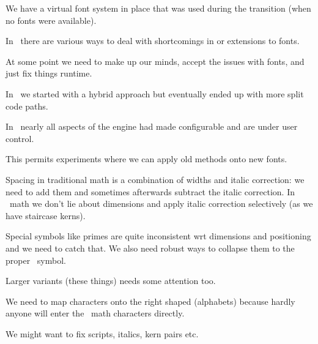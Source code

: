\startitem
    We have a virtual font system in place that was used during the transition (when no
    fonts were available).
\stopitem

\startitem
    In \CONTEXT\ there are various ways to deal with shortcomings in or extensions to fonts.
\stopitem

\startitem
    At some point we need to make up our minds, accept the issues with fonts, and
    just fix things runtime.
\stopitem

\stopitemize

\stoptitle

\starttitle[title=The engine]

\startitemize

\startitem
    In \LUATEX\ we started with a hybrid approach but eventually ended up with
    more split code paths.
\stopitem

\startitem
    In \LUAMETATEX\ nearly all aspects of the engine had made configurable and are under
    user control.
\stopitem

\startitem
    This permits experiments where we can apply old methods onto new fonts.
\stopitem

\stopitemize

\stoptitle

\starttitle[title=The tricky things]

\startitemize

\startitem
    Spacing in traditional math is a combination of widths and italic correction:
    we need to add them and sometimes afterwards subtract the italic correction.
    In \OPENTYPE\ math we don't lie about dimensions and apply italic correction
    selectively (as we have staircase kerns).
\stopitem

\startitem
    Special symbols like primes are quite inconsistent wrt dimensions and positioning
    and we need to catch that. We also need robust ways to collapse them to the proper
    \UNICODE\ symbol.
\stopitem

\startitem
    Larger variants (these \type {\bigg} things) needs some attention too.
\stopitem

\startitem
    We need to map characters onto the right shaped (alphabets) because hardly
    anyone will enter the \UNICODE\ math characters directly.
\stopitem

\startitem
    We might want to fix scripts, italics, kern pairs etc.
\stopitem

\stopitemize

\stoptitle

